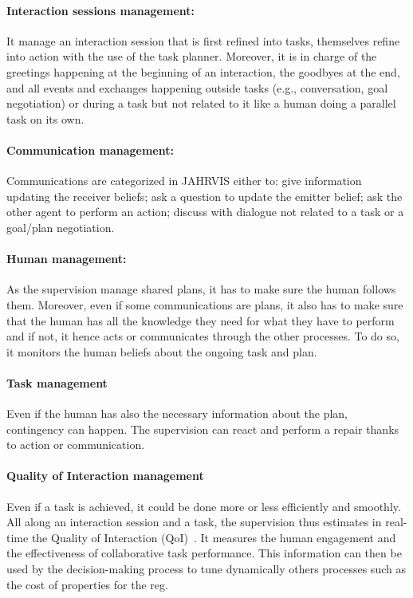 \paragraph{Interaction sessions management:} It manage an interaction session that is first refined into tasks, themselves refine into action with the use of the task planner. Moreover, it is in charge of the greetings happening at the beginning of an interaction, the goodbyes at the end, and all events and exchanges happening outside tasks (e.g., conversation, goal negotiation) or during a task but not related to it like a human doing a parallel task on its own.

\paragraph{Communication management:} Communications are categorized in JAHRVIS either to: give information updating the receiver beliefs; ask a question to update the emitter belief; ask the other agent to perform an action; discuss with dialogue not related to a task or a goal/plan negotiation. 

\paragraph{Human management:} As the supervision manage shared plans, it has to make sure the human follows them. Moreover, even if some communications are plans, it also has to make sure that the human has all the knowledge they need for what they have to perform and if not, it hence acts or communicates through the other processes. To do so, it monitors the human beliefs about the ongoing task and plan.

\paragraph{Task management} Even if the human has also the necessary information about the plan, contingency can happen. The supervision can react and perform a repair thanks to action or communication.

\paragraph{Quality of Interaction management} Even if a task is achieved, it could be done more or less efficiently and smoothly. All along an interaction session and a task, the supervision thus estimates in real-time the Quality of Interaction (QoI)~\cite{mayima_2020_toward}. It measures the human engagement and the effectiveness of collaborative task performance. This information can then be used by the decision-making process to tune dynamically others processes such as the cost of properties for the \acrshort{reg}.


